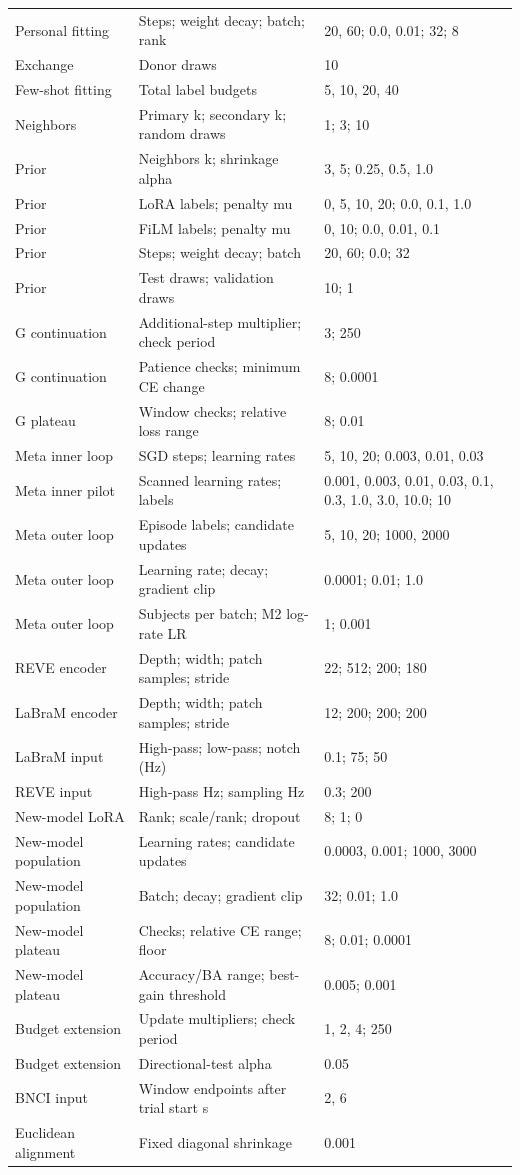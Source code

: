 \begin{longtable}{p{1.15in}p{2.7in}p{2.75in}}
Personal fitting & Steps; weight decay; batch; rank & 20, 60; 0.0, 0.01; 32; 8 \\
Exchange & Donor draws & 10 \\
Few-shot fitting & Total label budgets & 5, 10, 20, 40 \\
Neighbors & Primary k; secondary k; random draws & 1; 3; 10 \\
Prior & Neighbors k; shrinkage alpha & 3, 5; 0.25, 0.5, 1.0 \\
Prior & LoRA labels; penalty mu & 0, 5, 10, 20; 0.0, 0.1, 1.0 \\
Prior & FiLM labels; penalty mu & 0, 10; 0.0, 0.01, 0.1 \\
Prior & Steps; weight decay; batch & 20, 60; 0.0; 32 \\
Prior & Test draws; validation draws & 10; 1 \\
G continuation & Additional-step multiplier; check period & 3; 250 \\
G continuation & Patience checks; minimum CE change & 8; 0.0001 \\
G plateau & Window checks; relative loss range & 8; 0.01 \\
Meta inner loop & SGD steps; learning rates & 5, 10, 20; 0.003, 0.01, 0.03 \\
Meta inner pilot & Scanned learning rates; labels & 0.001, 0.003, 0.01, 0.03, 0.1, 0.3, 1.0, 3.0, 10.0; 10 \\
Meta outer loop & Episode labels; candidate updates & 5, 10, 20; 1000, 2000 \\
Meta outer loop & Learning rate; decay; gradient clip & 0.0001; 0.01; 1.0 \\
Meta outer loop & Subjects per batch; M2 log-rate LR & 1; 0.001 \\
REVE encoder & Depth; width; patch samples; stride & 22; 512; 200; 180 \\
LaBraM encoder & Depth; width; patch samples; stride & 12; 200; 200; 200 \\
LaBraM input & High-pass; low-pass; notch (Hz) & 0.1; 75; 50 \\
REVE input & High-pass Hz; sampling Hz & 0.3; 200 \\
New-model LoRA & Rank; scale/rank; dropout & 8; 1; 0 \\
New-model population & Learning rates; candidate updates & 0.0003, 0.001; 1000, 3000 \\
New-model population & Batch; decay; gradient clip & 32; 0.01; 1.0 \\
New-model plateau & Checks; relative CE range; floor & 8; 0.01; 0.0001 \\
New-model plateau & Accuracy/BA range; best-gain threshold & 0.005; 0.001 \\
Budget extension & Update multipliers; check period & 1, 2, 4; 250 \\
Budget extension & Directional-test alpha & 0.05 \\
BNCI input & Window endpoints after trial start s & 2, 6 \\
Euclidean alignment & Fixed diagonal shrinkage & 0.001 \\
\bottomrule
\end{longtable}
